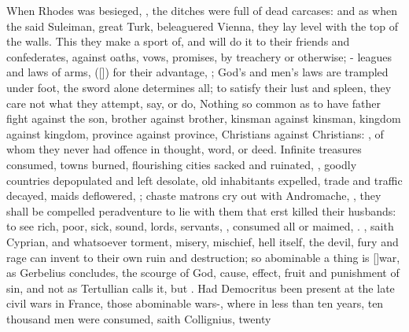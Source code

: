 {When Rhodes was besieged, ,
the ditches were full of dead carcases: and as when the said Suleiman,
great Turk, beleaguered Vienna, they lay level with the top of the
walls. This they make a sport of, and will do it to their friends and
confederates, against oaths, vows, promises, by treachery or otherwise;
- leagues and laws of
arms, ([\baselineskip]) for their advantage, ; God's and men's laws are
trampled under foot, the sword alone determines all; to satisfy their
lust and spleen, they care not what they attempt, say, or do,  Nothing so common as to
have  father fight against the son, brother against brother,
kinsman against kinsman, kingdom against kingdom, province against
province, Christians against Christians: , of whom they never had offence in thought,
word, or deed. Infinite treasures consumed, towns burned, flourishing
cities sacked and ruinated, , goodly
countries depopulated and left desolate, old inhabitants expelled,
trade and traffic decayed, maids deflowered, ; chaste matrons cry out with
Andromache, , they shall be compelled peradventure to lie with them that
erst killed their husbands: to see rich, poor, sick, sound, lords,
servants, , consumed all or maimed, \etc{}. , saith Cyprian,
and whatsoever torment, misery, mischief, hell itself, the devil, 
fury and rage can invent to their own ruin and destruction; so
abominable a thing is [\baselineskip]war, as Gerbelius concludes,  the
scourge of God, cause, effect, fruit and punishment of sin, and not
 as Tertullian calls it, but . Had
Democritus been present at the late civil wars in France, those
abominable wars-, where in less than
ten years, ten thousand men were consumed, saith Collignius, twenty
}
